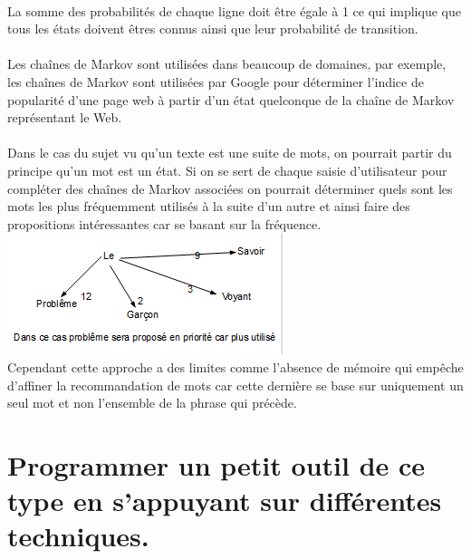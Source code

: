 \documentclass[final, 10pt]{report}
\begin{document}
\\
La somme des probabilités de chaque ligne doit être égale à 1 ce qui implique que tous les états doivent êtres connus ainsi que leur probabilité de transition.\\
\\
Les chaînes de Markov sont utilisées dans beaucoup de domaines, par exemple, les chaînes de Markov sont utilisées par Google pour déterminer l'indice de popularité d'une page web à partir d'un état quelconque de la chaîne de Markov représentant le Web.\\
\\
Dans le cas du sujet vu qu'un texte est une suite de mots, on pourrait partir du principe qu'un mot est un état.
Si on se sert de chaque saisie d'utilisateur pour compléter des chaînes de Markov associées on pourrait déterminer quels sont les mots les plus fréquemment utilisés à la suite d'un autre et ainsi faire des propositions intéressantes car se basant sur la fréquence.\\
\includegraphics[scale=1]{img/Mark.png}\\
Cependant cette approche a des limites comme l'absence de mémoire qui empêche d'affiner la recommandation de mots car cette dernière se base sur uniquement un seul mot et non l'ensemble de la phrase qui précède.
\chapter{Programmer un petit outil de ce type en s’appuyant sur différentes techniques.}

\printbibliography
\end{document}
